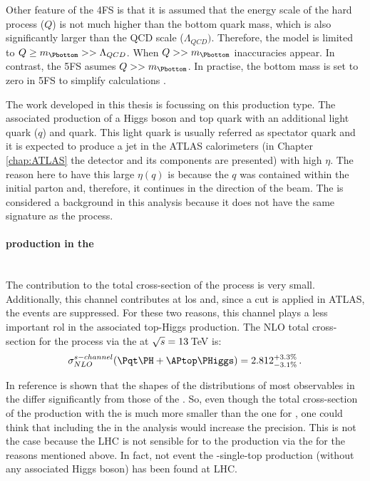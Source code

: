 Other feature of the 4FS is that it is assumed that the energy scale
of the hard process ($Q$) is not much higher than the bottom quark
mass, which is also significantly larger than the QCD scale ($\Lambda_{QCD})$.
Therefore, the model is limited to $Q \geq m_{\Pbottom} >> \Lambda_{QCD}$.
When $Q >> m_{\Pbottom}$ inaccuracies appear. 
In contrast, the 5FS asumes $Q >> m_{\Pbottom}$. In practise, the bottom mass
is set to zero in 5FS to simplify calculations \cite{Demartin:2015uha}.

The work developed in this thesis is focussing on this production type.
The associated production of a Higgs boson and top quark with an additional
light quark ($q$) and \Pbottom quark. This light quark is usually referred as spectator quark and it is expected 
to produce a jet in the ATLAS calorimeters (in Chapter \ref{chap:ATLAS} the 
detector and its components are presented)  with high $\eta$. 
The reason here to have this large $\eta(q)$ is because the $q$ was contained within the initial parton
and, therefore, it continues in the direction of the beam. %
The \tWH is considered a background in this analysis because
it does not have the same signature as the \tHq process.



\paragraph{\tH production in the \schannel}\mbox{}\\
The \schannel contribution to the total cross-section of the \tH process
is very small. Additionally, this channel contributes at los \pT and,
since a \pT cut is applied in ATLAS, the \schannel events are suppressed.
For these two reasons, this channel plays a less important rol in the
associated top-Higgs production. The NLO total cross-section for the 
\tH process via the \schannel at $\sqrt{s}=13\,$TeV is:
\begin{equation}
	\sigma_{NLO}^{\schannel} (\tH + \APtop\PHiggs) = 2.812^{+3.3\%}_{-3.1\%}\,.
\end{equation}

In reference \cite{Demartin:2015uha} is shown that the shapes of the distributions 
of most observables in the \schannel differ significantly 
from those of the \tchannel. So, even though the total cross-section of the \tH production 
with the \schannel is much more smaller than the one for \tchannel, one 
could think that including the \schannel in the analysis would increase the precision. 
This is not the case because the LHC is not sensible for to the \tH production
via the \schannel for the reasons mentioned above. 
In fact, not event the \schannel-single-top production 
(without any associated Higgs boson) has been found at LHC. 

